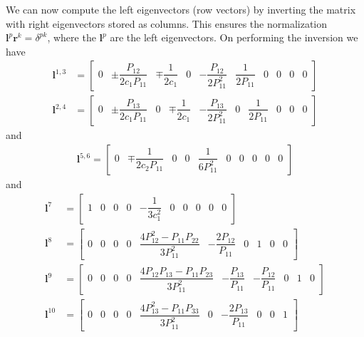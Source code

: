 \documentclass[11pt, reqno]{amsart}
\newcommand{\mvec}[1]{\mathbf{#1}}
\theoremstyle{definition}
\begin{document}
We can now compute the left eigenvectors (row vectors) by inverting
the matrix with right eigenvectors stored as columns. This ensures the
normalization $\mvec{l}^p \mvec{r}^k = \delta^{pk}$, where the
$\mvec{l}^p$ are the left eigenvectors. On performing the inversion we
have
\begin{align}
  \mvec{l}^{1,3} &= 
  \left[
    \begin{matrix}
      0 & \pm\dfrac{P_{12}}{2c_1P_{11}} & \mp\dfrac{1}{2c_1} & 
      0 & -\dfrac{P_{12}}{2P_{11}^2} & \dfrac{1}{2P_{11}} & 0 & 0 & 0 & 0
    \end{matrix}
  \right] \\
  \mvec{l}^{2,4} &= 
  \left[
    \begin{matrix}
      0 & \pm\dfrac{P_{13}}{2c_1P_{11}} & 0 & \mp\dfrac{1}{2c_1}
      & -\dfrac{P_{13}}{2P_{11}^2} & 0 & \dfrac{1}{2P_{11}} & 0 & 0 & 0
    \end{matrix}
  \right]
\end{align}
and
\begin{align}
  \mvec{l}^{5,6} = 
  \left[
    \begin{matrix}
      0 & \mp\dfrac{1}{2c_2P_{11}} & 0 & 0 & \dfrac{1}{6P_{11}^2}
      & 0 & 0 & 0 & 0 & 0
    \end{matrix}
    \right]
\end{align}
and
\begin{align}
  \mvec{l}^{7} &= 
  \left[
    \begin{matrix}
      1 & 0 & 0 & 0 & -\dfrac{1}{3c_1^2} & 0 & 0 & 0 & 0 & 0
    \end{matrix}
    \right] \\
  \mvec{l}^{8} &= 
  \left[
    \begin{matrix}
      0 & 0 & 0 & 0 & \dfrac{4P_{12}^2-P_{11}P_{22}}{3P_{11}^2} 
      & -\dfrac{2P_{12}}{P_{11}} & 0 & 1 & 0 & 0
    \end{matrix}
    \right] \\
  \mvec{l}^{9} &= 
  \left[
    \begin{matrix}
      0 & 0 & 0 & 0 & \dfrac{4P_{12}P_{13}-P_{11}P_{23}}{3P_{11}^2} 
      & -\dfrac{P_{13}}{P_{11}} & -\dfrac{P_{12}}{P_{11}} & 0 & 1 & 0
    \end{matrix}
    \right] \\
  \mvec{l}^{10} &= 
  \left[
    \begin{matrix}
      0 & 0 & 0 & 0 & \dfrac{4P_{13}^2-P_{11}P_{33}}{3P_{11}^2} & 0
      & -\dfrac{2P_{13}}{P_{11}} & 0 & 0 & 1
    \end{matrix}
    \right]
\end{align}
\end{document}
